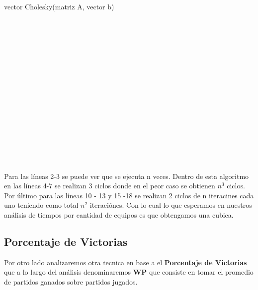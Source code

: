 \begin{algorithm}
    \begin{algorithmic}[1]\parskip=2mm
        \caption{vector Cholesky(matriz A, vector b)}
        \\
        \\
        \\
        \\
        \\
        \\
        \\
        \\
        \\
        \\
        \\
        \\
        \\
        \\
        \\
    \end{algorithmic}
\end{algorithm}
Para las l\'ineas 2-3 se puede ver que se ejecuta n veces.
Dentro de esta algoritmo en las l\'ineas 4-7 se realizan 3 ciclos donde en el peor caso se obtienen $n^3 $ ciclos.
Por \'ultimo para las l\'ineas 10 - 13 y 15 -18 se realizan 2 ciclos de n iteracines cada uno teniendo como total $n^2$ iteraci\'ones.
Con lo cual lo que esperamos en nuestros an\'alisis de tiempos por cantidad de equipos es que obtengamos una cubica.

\newpage
\subsection{Porcentaje de Victorias}

Por otro lado analizaremos otra tecnica en base a el \textbf{Porcentaje de Victorias} que a lo largo del análisis denominaremos \textbf{WP} que consiste en 
tomar el promedio de partidos ganados sobre partidos jugados.

